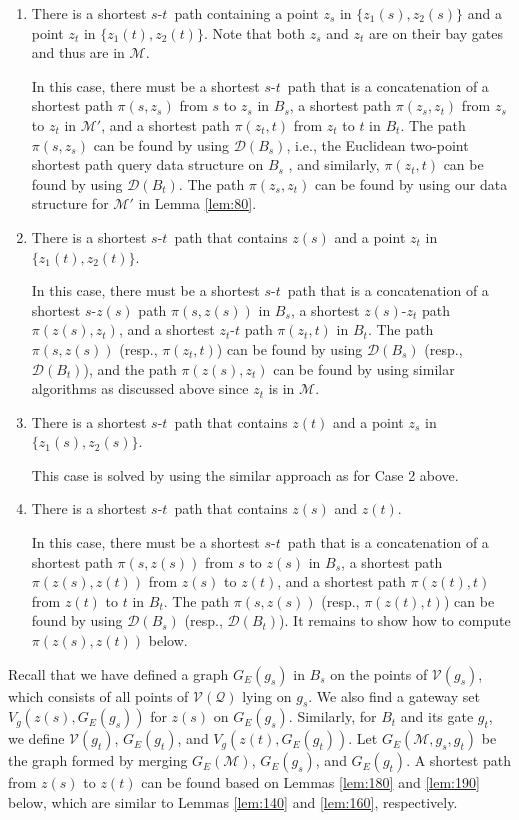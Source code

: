 \documentclass[english,runningheads,11pt]{llncs}
\def\calM{\mathcal{M}}
\def\calQ{\mathcal{Q}}
\def\calD{\mathcal{D}}
\def\calV{\mathcal{V}}
\def\st{$s$-$t$}
\begin{document}
\begin{enumerate}
\item
There is a shortest \st\ path containing a point $z_s$ in
$\{z_1(s),z_2(s)\}$ and a point $z_t$ in $\{z_1(t),z_2(t)\}$.
Note that both $z_s$ and $z_t$ are on their bay gates and thus are in $\calM$.

In this case, there must be a shortest \st\ path that is a
concatenation of a shortest path $\pi(s,z_s)$ from $s$ to $z_s$ in
$B_s$, a shortest path $\pi(z_s,z_t)$ from $z_s$ to $z_t$ in $\calM'$,
and a shortest path $\pi(z_t,t)$ from $z_t$ to $t$ in $B_t$. The path
$\pi(s,z_s)$ can be found by using $\calD(B_s)$, i.e., the Euclidean
two-point shortest path query data structure on $B_s$
\cite{ref:GuibasOp89}, and similarly, $\pi(z_t,t)$ can be found by
using $\calD(B_t)$. The path $\pi(z_s,z_t)$ can be found by using our data
structure for $\calM'$ in Lemma \ref{lem:80}.

\item
There is a shortest \st\ path that contains $z(s)$
and a point $z_t$ in $\{z_1(t),z_2(t)\}$.

In this case, there must be a shortest \st\ path that is a
concatenation of a shortest $s$-$z(s)$ path $\pi(s,z(s))$ in
$B_s$, a shortest $z(s)$-$z_t$ path $\pi(z(s),z_t)$, and a shortest $z_t$-$t$ path
$\pi(z_t,t)$ in $B_t$.
The path $\pi(s,z(s))$ (resp., $\pi(z_t,t)$) can be found by using $\calD(B_s)$
(resp., $\calD(B_t)$), and the path
$\pi(z(s),z_t)$ can be found by using similar algorithms
as discussed above since $z_t$ is in $\calM$.

\item
There is a shortest \st\ path that contains $z(t)$
and a point $z_s$ in $\{z_1(s),z_2(s)\}$.

This case is solved by using the similar approach as for Case 2 above.

\item
There is a shortest \st\ path that contains $z(s)$ and $z(t)$.

In this case, there must be a shortest \st\ path that is a concatenation of a shortest path
$\pi(s,z(s))$ from $s$ to $z(s)$ in
$B_s$, a shortest path $\pi(z(s),z(t))$ from $z(s)$ to $z(t)$,
and a shortest path $\pi(z(t),t)$ from $z(t)$ to $t$ in $B_t$.
The path $\pi(s,z(s))$ (resp., $\pi(z(t),t)$) can be found by using $\calD(B_s)$
(resp., $\calD(B_t)$).  It remains to show how to compute $\pi(z(s),z(t))$ below.
\end{enumerate}

Recall that we have defined a graph $G_E(g_s)$ in $B_s$ on the points of
$\calV(g_s)$, which consists of all points of $\calV(\calQ)$ lying on $g_s$. We
also find a gateway set $V_g(z(s),G_E(g_s))$ for $z(s)$ on $G_E(g_s)$. Similarly,
for $B_t$ and its gate $g_t$, we define $\calV(g_t)$, $G_E(g_t)$, and
$V_g(z(t),G_E(g_t))$. Let $G_E(\calM,g_s,g_t)$ be the graph formed by merging
$G_E(\calM)$, $G_E(g_s)$, and $G_E(g_t)$.
A shortest path from $z(s)$ to $z(t)$ can be found based on Lemmas \ref{lem:180} and \ref{lem:190}
below, which are similar to Lemmas \ref{lem:140} and \ref{lem:160}, respectively.
\end{document}
